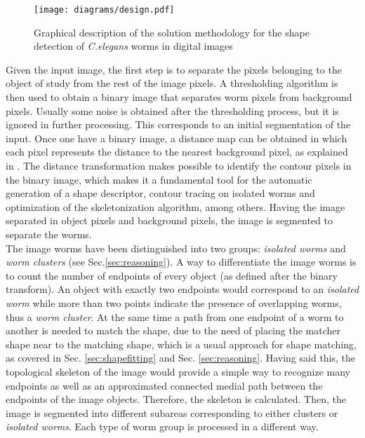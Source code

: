 \begin{figure}[h t b p ! H]
 \centering
   \texttt{[image: diagrams/design.pdf]}
 \caption{Graphical description of the solution methodology for the shape detection
 of \emph{C.elegans} worms in digital images}
\label{fig:methsol}
\end{figure}

Given the input image, the first step is to separate the pixels belonging to the object
of study from the rest of the image pixels. A thresholding algorithm is then used to
obtain a binary image that separates worm pixels from background pixels. Usually some
noise is obtained after the thresholding process, but it is ignored in further processing.
This corresponds to an initial segmentation of the input. Once one have a binary image, a
distance map can be obtained in which each pixel represents the distance to the 
nearest background pixel, as explained in \cite{dtresearch}. The distance transformation
makes possible to identify the contour pixels in the binary image, which makes it a fundamental
tool for the automatic generation of a shape descriptor, contour tracing on isolated worms 
and optimization of the skeletonization algorithm, among others. Having the image 
separated in object pixels and background pixels, the image is segmented to separate
the worms. \\

The image worms have been distinguished into two groups: \emph{isolated worms}
and \emph{worm clusters} (see Sec.\ref{sec:reasoning}). A way to differentiate the image worms
is to count the number of endpoints of every object (as defined after the binary transform).
An object with exactly two endpoints would correspond to an \emph{isolated worm} while
more than two points indicate the presence of overlapping worms, thus a \emph{worm cluster}.
At the same time a path from one endpoint of a worm to another is needed to match
the shape, due to the need of placing the matcher shape near to the matching shape, which
is a usual approach for shape matching, as covered in Sec. \ref{sec:shapefitting} and
Sec. \ref{sec:reasoning}. Having said this, the topological skeleton of the image 
would provide a simple way to recognize many endpoints as well as an approximated 
connected medial path between the endpoints of the image objects. 
Therefore, the skeleton is calculated. Then, the image is segmented into 
different subareas corresponding to either clusters or \emph{isolated
worms}. Each type of worm group is processed in a different way.

